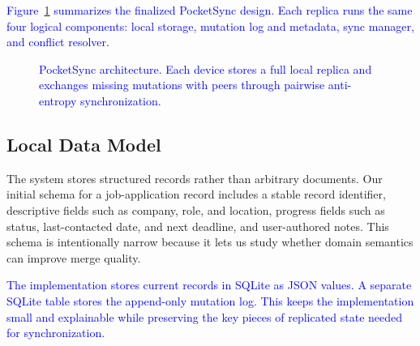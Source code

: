 \documentclass[10pt,twocolumn]{article}
\newcommand{\update}[1]{\textcolor{blue}{#1}}
\begin{document}
\update{Figure~\ref{fig:architecture} summarizes the finalized PocketSync design. Each replica runs the same four logical components: local storage, mutation log and metadata, sync manager, and conflict resolver.}

\begin{figure}[t]
\centering
{}
\caption{\update{PocketSync architecture. Each device stores a full local replica and exchanges missing mutations with peers through pairwise anti-entropy synchronization.}}
\label{fig:architecture}
\end{figure}

\subsection{Local Data Model}

The system stores structured records rather than arbitrary documents. Our initial schema for a job-application record includes a stable record identifier, descriptive fields such as company, role, and location, progress fields such as status, last-contacted date, and next deadline, and user-authored notes. This schema is intentionally narrow because it lets us study whether domain semantics can improve merge quality.

\update{The implementation stores current records in SQLite as JSON values. A separate SQLite table stores the append-only mutation log. This keeps the implementation small and explainable while preserving the key pieces of replicated state needed for synchronization.}
\end{document}
